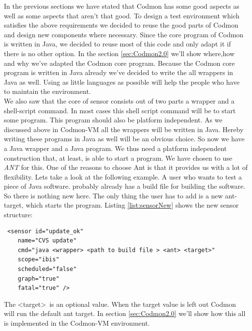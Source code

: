 \documentclass[a4paper,10pt]{scrartcl}
\newcommand{\project}{Codmon-VM}
\begin{document}
\noindent In the previous sections we have stated that Codmon has some good aspects as well as some aspects that aren't that good. To design a test environment which satisfies the above requirements 
we decided to reuse the good parts of Codmon and design new components where necessary. Since the core program of Codmon is written in Java, we decided to reuse most of this code and only adapt 
it if there is no other option. In the section \ref{sec:Codmon2.0} we'll show where,how and why we've adapted the Codmon core program. Because the Codmon core program is written in Java already we've 
decided to write the all wrappers in Java as well. Using as little languages as possible will help the people who have to maintain the environment.\\

\noindent We also saw that the core of sensor consists out of two parts a wrapper and a shell-script command. In most cases this shell script command will be to start some program. This program should also 
be platform independent. As we discussed above in \project{} all the wrappers will be written in Java. Hereby writing these programs in Java as well will be an obvious choice. So now we have a Java wrapper
and a Java program. We thus need a platform independent construction that, at least, is able to start a program. We have chosen to use \emph{ANT} for this. One of the reasons to choose Ant is that it provides 
us with a lot of flexibility. Lets take a look at the following example. A user who wants to test a piece of Java software. probably already has a build file for building the software. So there is nothing new 
here. The only thing the user has to add is a new ant-target, which starts the program. Listing \ref{list:sensorNew} shows the new sensor structure:

\begin{lstlisting}
 <sensor id="update_ok" 
    name="CVS update" 
    cmd="java <wrapper> <path to build file > <ant> <target>" 
    scope="ibis" 
    scheduled="false" 
    graph="true" 
    fatal="true" />
\end{lstlisting}

The \textless target\textgreater \ is an optional value. When the target value is left out Codmon will run the default ant target. In section \ref{sec:Codmon2.0} we'll show how this all is implemented in the 
\project{} environment.\\
\end{document}
